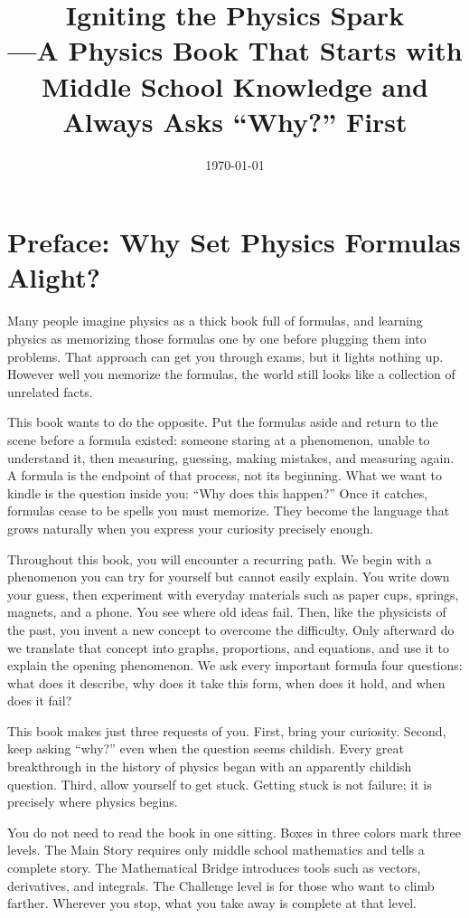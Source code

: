 \documentclass[fontset=fandol,12pt,openany]{ctexbook}
\title{Igniting the Physics Spark\\{\large ---A Physics Book That Starts with Middle School Knowledge and Always Asks ``Why?'' First}}
\author{}
\date{\today}
\begin{document}
\frontmatter
\maketitle

\chapter*{Preface: Why Set Physics Formulas Alight?}

Many people imagine physics as a thick book full of formulas, and learning physics as memorizing those formulas one by one before plugging them into problems. That approach can get you through exams, but it lights nothing up. However well you memorize the formulas, the world still looks like a collection of unrelated facts.

This book wants to do the opposite. Put the formulas aside and return to the scene before a formula existed: someone staring at a phenomenon, unable to understand it, then measuring, guessing, making mistakes, and measuring again. A formula is the endpoint of that process, not its beginning. What we want to kindle is the question inside you: ``Why does this happen?'' Once it catches, formulas cease to be spells you must memorize. They become the language that grows naturally when you express your curiosity precisely enough.

Throughout this book, you will encounter a recurring path. We begin with a phenomenon you can try for yourself but cannot easily explain. You write down your guess, then experiment with everyday materials such as paper cups, springs, magnets, and a phone. You see where old ideas fail. Then, like the physicists of the past, you invent a new concept to overcome the difficulty. Only afterward do we translate that concept into graphs, proportions, and equations, and use it to explain the opening phenomenon. We ask every important formula four questions: what does it describe, why does it take this form, when does it hold, and when does it fail?

This book makes just three requests of you. First, bring your curiosity. Second, keep asking ``why?'' even when the question seems childish. Every great breakthrough in the history of physics began with an apparently childish question. Third, allow yourself to get stuck. Getting stuck is not failure; it is precisely where physics begins.

You do not need to read the book in one sitting. Boxes in three colors mark three levels. The Main Story requires only middle school mathematics and tells a complete story. The Mathematical Bridge introduces tools such as vectors, derivatives, and integrals. The Challenge level is for those who want to climb farther. Wherever you stop, what you take away is complete at that level.
\end{document}
